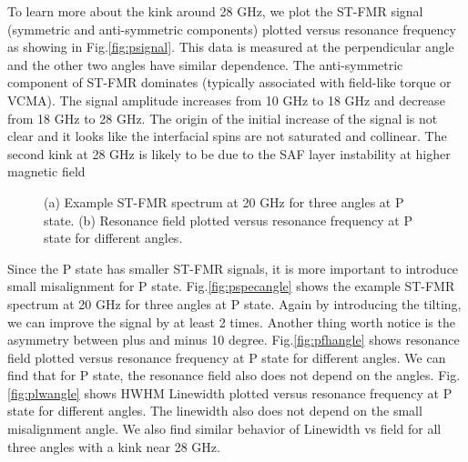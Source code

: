 To learn more about the kink around 28 GHz, we plot the ST-FMR signal (symmetric and anti-symmetric components) plotted versus resonance frequency as showing in Fig.\ref{fig:psignal}. This data is measured at the perpendicular angle and the other two angles have similar dependence. The anti-symmetric component of ST-FMR dominates (typically associated with field-like torque or VCMA). The signal amplitude increases from 10 GHz to 18 GHz and decrease from 18 GHz to 28 GHz. The origin of the initial increase of the signal is not clear and it looks like the interfacial spins are not saturated and collinear. The second kink at 28 GHz is likely to be due to the SAF layer instability at higher magnetic field


\begin{figure}[!ht]
\centering
{}
\caption{(a) Example ST-FMR spectrum at 20 GHz for three angles at P state. (b) Resonance field plotted versus resonance frequency at P state for different angles.}
\end{figure}

Since the P state has smaller ST-FMR signals, it is more important to introduce small misalignment for P state. Fig.\ref{fig:pspecangle} shows the example ST-FMR spectrum at 20 GHz for three angles at P state. Again by introducing the tilting, we can improve the signal by at least 2 times. Another thing worth notice is the asymmetry between plus and minus 10 degree. Fig.\ref{fig:pfhangle} shows resonance field plotted versus resonance frequency at P state for different angles. We can find that for P state, the resonance field also does not depend on the angles. Fig.\ref{fig:plwangle} shows HWHM Linewidth plotted versus resonance frequency at P state for different angles. The linewidth also does not depend on the small misalignment angle. We also find similar behavior of Linewidth vs field for all three angles with a  kink near 28 GHz.

